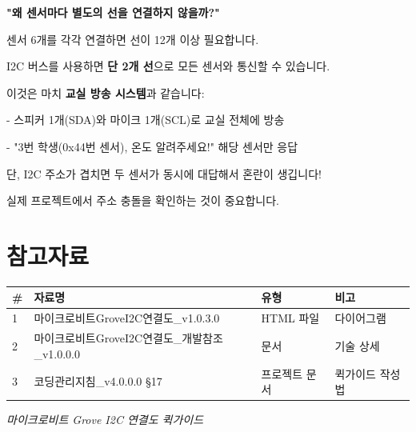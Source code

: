 \documentclass[11pt,a4paper]{article}
\begin{document}
\begin{tcolorbox}[summarybox]
\textbf{"왜 센서마다 별도의 선을 연결하지 않을까?"}

\vspace{0.3em}
센서 6개를 각각 연결하면 선이 12개 이상 필요합니다.

I2C 버스를 사용하면 \textbf{단 2개 선}으로 모든 센서와 통신할 수 있습니다.

\vspace{0.3em}
이것은 마치 \textbf{교실 방송 시스템}과 같습니다:

- 스피커 1개(SDA)와 마이크 1개(SCL)로 교실 전체에 방송

- "3번 학생(0x44번 센서), 온도 알려주세요!" \textrightarrow{} 해당 센서만 응답

\vspace{0.3em}
단, I2C 주소가 겹치면 두 센서가 동시에 대답해서 혼란이 생깁니다!

실제 프로젝트에서 주소 충돌을 확인하는 것이 중요합니다.

\end{tcolorbox}


\section*{참고자료}

\begin{center}
\renewcommand{\arraystretch}{1.4}
\begin{tabular}{|p{1.5cm}|p{7.9cm}|p{2.6cm}|p{3.0cm}|}
\hline
\rowcolor{tableheader}
\textbf{\#} & \textbf{자료명} & \textbf{유형} & \textbf{비고} \\
\hline
1 & 마이크로비트GroveI2C연결도\_v1.0.3.0 & HTML 파일 & 다이어그램 \\
\hline
2 & 마이크로비트GroveI2C연결도\_개발참조\_v1.0.0.0 & 문서 & 기술 상세 \\
\hline
3 & 코딩관리지침\_v4.0.0.0 \S{}17 & 프로젝트 문서 & 퀵가이드 작성법 \\
\hline
\end{tabular}
\end{center}


\vfill
\begin{center}
\small\color{lightbrown}
\textit{마이크로비트 Grove I2C 연결도 퀵가이드}
\end{center}
\end{document}
